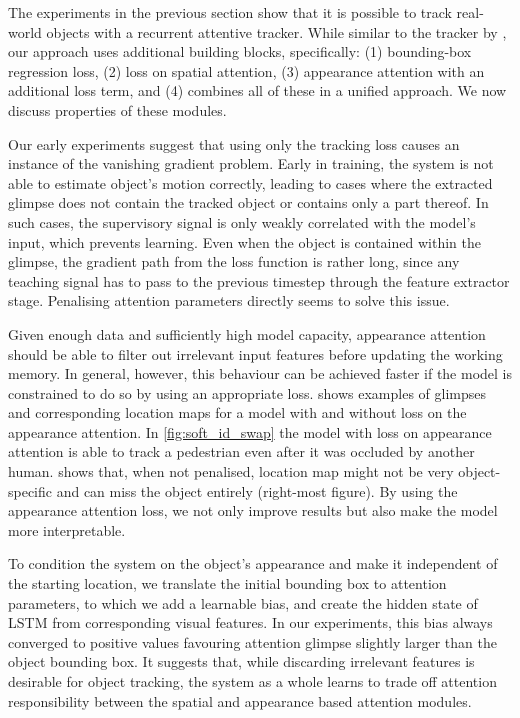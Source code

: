   
    The experiments in the previous section show that it is possible to track real-world objects with a recurrent attentive tracker. While similar to the tracker by \citet{Kahou2015ratm}, our approach uses additional building blocks, specifically: 
        (1) bounding-box regression loss,
        (2) loss on spatial attention,
        (3) appearance attention with an additional loss term, and
        (4) combines all of these in a unified approach.
    We now discuss properties of these modules.
    \begin{description}[leftmargin=\parindent]
        \item[Spatial Attention Loss prevents Vanishing Gradients]        
        Our early experiments suggest that using only the tracking loss causes an instance of the vanishing gradient problem. Early in training, the system is not able to estimate object's motion correctly, leading to cases where the extracted glimpse does not contain the tracked object or contains only a part thereof. In such cases, the supervisory signal is only weakly correlated with the model's input, which prevents learning. Even when the object is contained within the glimpse, the gradient path from the loss function is rather long, since any teaching signal has to pass to the previous timestep through the feature extractor stage. Penalising attention parameters directly seems to solve this issue.
        
        \item[Is Appearance Attention Loss Necessary?]
        Given enough data and sufficiently high model capacity, appearance attention should be able to filter out irrelevant input features before updating the working memory. In general, however, this behaviour can be achieved faster if the model is constrained to do so by using an appropriate loss.  shows examples of glimpses and corresponding location maps for a model with and without loss on the appearance attention. In \cref{fig:soft_id_swap} the model with loss on appearance attention is able to track a pedestrian even after it was occluded by another human.  shows that, when not penalised, location map might not be very object-specific and can miss the object entirely (right-most figure). By using the appearance attention loss, we not only improve results but also make the model more interpretable.
    
        \item[Spatial Attention Bias is Always Positive]
        To condition the system on the object's appearance and make it independent of the starting location, we translate the initial bounding box to attention parameters, to which we add a learnable bias, and create the hidden state of LSTM from corresponding visual features. In our experiments, this bias always converged to positive values favouring attention glimpse slightly larger than the object bounding box. It suggests that, while discarding irrelevant features is desirable for object tracking, the system as a whole learns to trade off attention responsibility between the spatial and appearance based attention modules.
        
        
    \end{description}